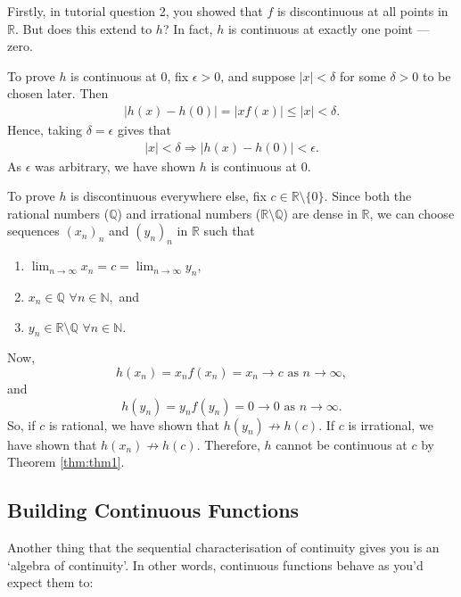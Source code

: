 \documentclass[
  12pt,
  a4paper]{extarticle}
\providecommand{\tightlist}{%
  \setlength{\itemsep}{0pt}\setlength{\parskip}{0pt}}
\theoremstyle{plain}
\theoremstyle{definition}
\theoremstyle{plain}
\theoremstyle{plain}
\theoremstyle{plain}
\theoremstyle{plain}
\theoremstyle{definition}
\theoremstyle{definition}
\theoremstyle{remark}
\theoremstyle{remark}
\let\BeginKnitrBlock\begin \let\EndKnitrBlock\end
\renewcommand{\;}{\,}
\begin{document}
\BeginKnitrBlock{solution*}
Firstly, in tutorial question 2, you showed that \(f\) is discontinuous at all points in \(\mathbb{R}\). But does this extend to \(h\)? In fact, \(h\) is continuous at exactly one point --- zero.

To prove \(h\) is continuous at \(0\), fix \(\epsilon > 0\), and suppose \(\lvert x \rvert < \delta\) for some \(\delta > 0\) to be chosen later. Then
\begin{align*}
\lvert h(x) - h(0) \rvert = \lvert x f(x) \rvert \leq \lvert x \rvert < \delta.
\end{align*}
Hence, taking \(\delta = \epsilon\) gives that
\begin{align*}
\lvert x \rvert < \delta \Longrightarrow \lvert h(x) - h(0) \rvert < \epsilon.
\end{align*}
As \(\epsilon\) was arbitrary, we have shown \(h\) is continuous at \(0\).

To prove \(h\) is discontinuous everywhere else, fix \(c \in \mathbb{R}\setminus \lbrace 0 \rbrace.\) Since both the rational numbers (\(\mathbb{Q}\)) and irrational numbers (\(\mathbb{R}\setminus\mathbb{Q}\)) are dense in \(\mathbb{R}\), we can choose sequences \((x_n)_n\) and \((y_n)_n\) in \(\mathbb{R}\) such that

\begin{enumerate}
\def\labelenumi{\arabic{enumi}.}
\tightlist
\item
  \(\lim_{n \to \infty} x_n = c = \lim_{n \to \infty} y_n\),
\item
  \(x_n \in \mathbb{Q}\;\;\forall n \in \mathbb{N},\) and
\item
  \(y_n \in \mathbb{R}\setminus\mathbb{Q}\;\;\forall n \in \mathbb{N}.\)
\end{enumerate}

Now, \[h(x_n) = x_n f(x_n) = x_n \to c \;\;\text{as}\;\; n \to \infty,\] and \[h(y_n) = y_n f(y_n) = 0 \to 0 \;\;\text{as}\;\; n \to \infty.\] So, if \(c\) is rational, we have shown that \(h(y_n)\not\to h(c)\). If \(c\) is irrational, we have shown that \(h(x_n)\not\to h(c)\). Therefore, \(h\) cannot be continuous at \(c\) by Theorem \ref{thm:thm1}.
\EndKnitrBlock{solution*}

\hypertarget{building-continuous-functions}{%
\subsection{Building Continuous Functions}\label{building-continuous-functions}}

Another thing that the sequential characterisation of continuity gives you is an `algebra of continuity'. In other words, continuous functions behave as you'd expect them to:
\end{document}
